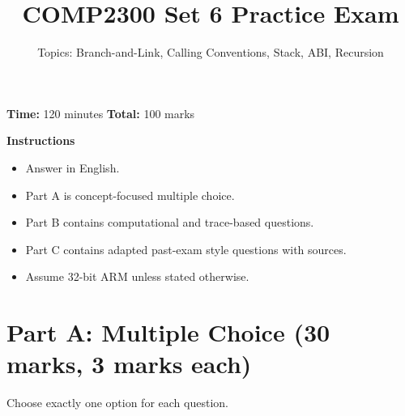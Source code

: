 \documentclass[11pt]{article}
\title{COMP2300 Set 6 Practice Exam}
\author{Topics: Branch-and-Link, Calling Conventions, Stack, ABI, Recursion}
\date{}
\begin{document}
\maketitle

\noindent\textbf{Time:} 120 minutes \hfill
\textbf{Total:} 100 marks

\vspace{0.5em}
\noindent\textbf{Instructions}
\begin{itemize}[leftmargin=1.5em]
  \item Answer in English.
  \item Part A is concept-focused multiple choice.
  \item Part B contains computational and trace-based questions.
  \item Part C contains adapted past-exam style questions with sources.
  \item Assume 32-bit ARM unless stated otherwise.
\end{itemize}

\section*{Part A: Multiple Choice (30 marks, 3 marks each)}
Choose exactly one option for each question.
\end{document}

